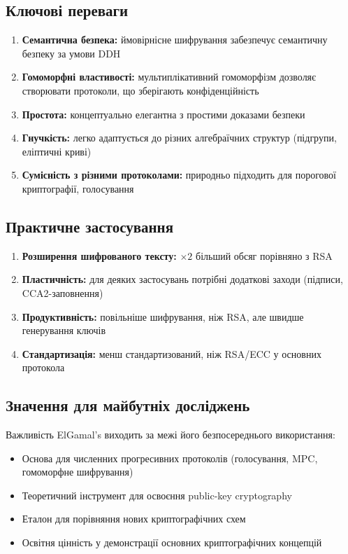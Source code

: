 \subsection{Ключові переваги}

\begin{enumerate}
    \item \textbf{Семантична безпека:} ймовірнісне шифрування забезпечує семантичну безпеку за умови DDH
    \item \textbf{Гомоморфні властивості:} мультиплікативний гомоморфізм дозволяє створювати протоколи, що 
        зберігають конфіденційність
    \item \textbf{Простота:} концептуально елегантна з простими доказами безпеки
    \item \textbf{Гнучкість:} легко адаптується до різних алгебраїчних структур (підгрупи, еліптичні криві)
    \item \textbf{Сумісність з різними протоколами:} природньо підходить для порогової криптографії, голосування
\end{enumerate}

\subsection{Практичне застосування}

\begin{enumerate}
    \item \textbf{Розширення шифрованого тексту:} $\times 2$ більший обсяг порівняно з RSA
    \item \textbf{Пластичність:} для деяких застосувань потрібні додаткові заходи (підписи, CCA2-заповнення)
    \item \textbf{Продуктивність:} повільніше шифрування, ніж RSA, але швидше генерування ключів
    \item \textbf{Стандартизація:} менш стандартизований, ніж RSA/ECC у основних протокола
\end{enumerate}

\subsection{Значення для майбутніх досліджень}

Важливість ElGamal's виходить за межі його безпосереднього використання:
\begin{itemize}
    \item Основа для численних прогресивних протоколів (голосування, MPC, гомоморфне шифрування)
    \item Теоретичний інструмент для освоєння public-key cryptography
    \item Еталон для порівняння нових криптографічних схем
    \item Освітня цінність у демонстрації основних криптографічних концепцій
\end{itemize}

